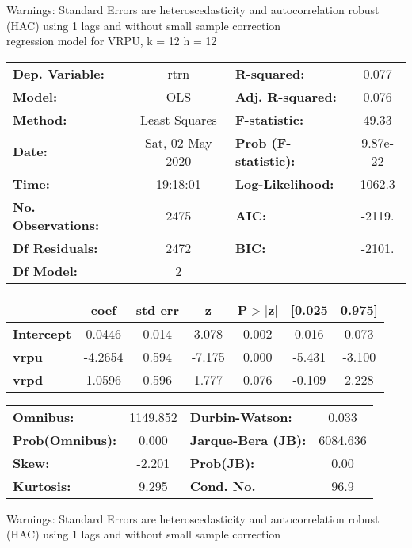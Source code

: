 Warnings: \newline
 [1] Standard Errors are heteroscedasticity and autocorrelation robust (HAC) using 1 lags and without small sample correction\\ 

regression model for VRPU, k = 12 h = 12\begin{center}
\begin{tabular}{lclc}
\toprule
\textbf{Dep. Variable:}    &       rtrn       & \textbf{  R-squared:         } &     0.077   \\
\textbf{Model:}            &       OLS        & \textbf{  Adj. R-squared:    } &     0.076   \\
\textbf{Method:}           &  Least Squares   & \textbf{  F-statistic:       } &     49.33   \\
\textbf{Date:}             & Sat, 02 May 2020 & \textbf{  Prob (F-statistic):} &  9.87e-22   \\
\textbf{Time:}             &     19:18:01     & \textbf{  Log-Likelihood:    } &    1062.3   \\
\textbf{No. Observations:} &        2475      & \textbf{  AIC:               } &    -2119.   \\
\textbf{Df Residuals:}     &        2472      & \textbf{  BIC:               } &    -2101.   \\
\textbf{Df Model:}         &           2      & \textbf{                     } &             \\
\bottomrule
\end{tabular}
\begin{tabular}{lcccccc}
                   & \textbf{coef} & \textbf{std err} & \textbf{z} & \textbf{P$> |$z$|$} & \textbf{[0.025} & \textbf{0.975]}  \\
\midrule
\textbf{Intercept} &       0.0446  &        0.014     &     3.078  &         0.002        &        0.016    &        0.073     \\
\textbf{vrpu}      &      -4.2654  &        0.594     &    -7.175  &         0.000        &       -5.431    &       -3.100     \\
\textbf{vrpd}      &       1.0596  &        0.596     &     1.777  &         0.076        &       -0.109    &        2.228     \\
\bottomrule
\end{tabular}
\begin{tabular}{lclc}
\textbf{Omnibus:}       & 1149.852 & \textbf{  Durbin-Watson:     } &    0.033  \\
\textbf{Prob(Omnibus):} &   0.000  & \textbf{  Jarque-Bera (JB):  } & 6084.636  \\
\textbf{Skew:}          &  -2.201  & \textbf{  Prob(JB):          } &     0.00  \\
\textbf{Kurtosis:}      &   9.295  & \textbf{  Cond. No.          } &     96.9  \\
\bottomrule
\end{tabular}
\end{center}

Warnings: \newline
 [1] Standard Errors are heteroscedasticity and autocorrelation robust (HAC) using 1 lags and without small sample correction\\ 


